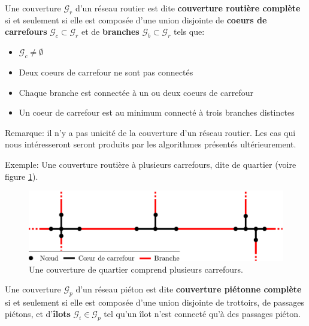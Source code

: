 \begin{definition}
    Une couverture $\mathcal{G}_r$ d'un réseau routier est dite \textbf{couverture routière complète} si et seulement si elle est composée d'une union disjointe de \textbf{coeurs de carrefours} $\mathcal{G}_c \subset \mathcal{G}_r$ et de \textbf{branches} $\mathcal{G}_b \subset \mathcal{G}_r$ tels que:

    \begin{itemize}
        \item $\mathcal{G}_c \neq \emptyset$ 
        \item Deux coeurs de carrefour ne sont pas connectés
        \item Chaque branche est connectée à un ou deux coeurs de carrefour
        \item Un coeur de carrefour est au minimum connecté à trois branches distinctes
    \end{itemize}
    \label{def:modelisation_couverture_routiere_complète}
\end{definition}

\noindent
Remarque: il n'y a pas unicité de la couverture d'un réseau routier. Les cas qui nous intéresseront seront produits par les algorithmes présentés ultérieurement.

\noindent
Exemple: Une couverture routière à plusieurs carrefours, dite de quartier (voire figure \ref{fig:mod_ex_couverture_quartier}).

\begin{figure}[ht]
    \centering
    \includegraphics[width=\textwidth]{images/modelisation/graphe/couverture_quartier.pdf}
    \caption[Couverture d'un quartier]{Une couverture de quartier comprend plusieurs carrefours.}
    \label{fig:mod_ex_couverture_quartier}
\end{figure}

\begin{definition}
    Une couverture $\mathcal{G}_p$ d'un réseau piéton est dite \textbf{couverture piétonne complète} si et seulement si elle est composée d'une union disjointe de trottoirs, de passages piétons, et d'\textbf{îlots} $\mathcal{G}_i \in \mathcal{G}_p$ tel qu'un îlot n'est connecté qu'à des passages piéton.
\end{definition}

